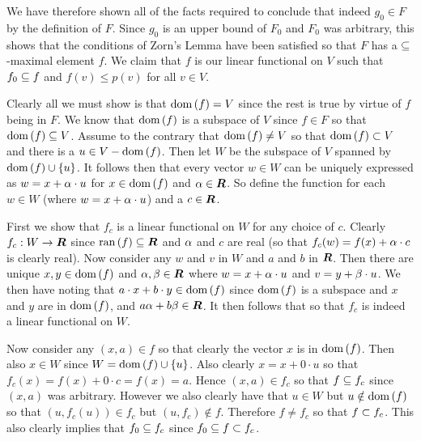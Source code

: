 \begin{questions}
{{      We have therefore shown all of the facts required to conclude that indeed $g_0 \in F$ by the definition of $F$.
      Since $g_0$ is an upper bound of $F_0$ and $F_0$ was arbitrary, this shows that the conditions of Zorn's Lemma have been satisfied so that $F$ has a $\ss$-maximal element $f$.
      We claim that $f$ is our linear functional on $V$ such that $f_0 \ss f$ and $f(v) \leq p(v)$ for all $v \in V$.

      Clearly all we must show is that $\dom(f) = V$ since the rest is true by virtue of $f$ being in $F$.
      We know that $\dom(f)$ is a subspace of $V$ since $f \in F$ so that $\dom(f) \ss V$.
      Assume to the contrary that $\dom(f) \neq V$ so that $\dom(f) \pss V$ and there is a $u \in V - \dom(f)$.
      Then let $W$ be the subspace of $V$ spanned by $\dom(f) \cup \braces{u}$.
      It follows then that every vector $w \in W$ can be uniquely expressed as $w = x + \a \cdot u$ for $x \in \dom(f)$ and $\a \in \reals$.
      So define the function
      for each $w \in W$ (where $w = x + \a \cdot u$) and a $c \in \reals$.

      First we show that $f_c$ is a linear functional on $W$ for any choice of $c$.
      Clearly $f_c : W \to \reals$ since $\ran(f) \ss \reals$ and $\a$ and $c$ are real (so that $f_c(w) = f(x) + \a \cdot c$ is clearly real).
      Now consider any $w$ and $v$ in $W$ and $a$ and $b$ in $\reals$.
      Then there are unique $x,y \in \dom(f)$ and $\a,\b \in \reals$ where $w = x + \a \cdot u$ and $v = y + \b \cdot u$.
      We then have
      noting that $a \cdot x + b \cdot y \in \dom(f)$ since $\dom(f)$ is a subspace and $x$ and $y$ are in $\dom(f)$, and $a\a + b \b \in \reals$.
      It then follows that
      so that $f_c$ is indeed a linear functional on $W$.

      Now consider any $(x, a) \in f$ so that clearly the vector $x$ is in $\dom(f)$.
      Then also $x \in W$ since $W = \dom(f) \cup \braces{u}$.
      Also clearly $x = x + 0 \cdot u$ so that $f_c(x) = f(x) + 0 \cdot c = f(x) = a$.
      Hence $(x, a) \in f_c$ so that $f \ss f_c$ since $(x,a)$ was arbitrary.
      However we also clearly have that $u \in W$ but $u \notin \dom(f)$ so that $(u, f_c(u)) \in f_c$ but $(u, f_c) \notin f$.
      Therefore $f \neq f_c$ so that $f \pss f_c$.
      This also clearly implies that $f_0 \ss f_c$ since $f_0 \ss f \pss f_c$.

}}
\end{questions}
